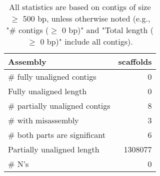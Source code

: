 \documentclass[12pt,a4paper]{article}
\begin{document}
\begin{table}[ht]
\begin{center}
\caption{All statistics are based on contigs of size $\geq$ 500 bp, unless otherwise noted (e.g., "\# contigs ($\geq$ 0 bp)" and "Total length ($\geq$ 0 bp)" include all contigs).}
\begin{tabular}{|l*{1}{|r}|}
\hline
Assembly & scaffolds \\ \hline
\# fully unaligned contigs & 0 \\ \hline
Fully unaligned length & 0 \\ \hline
\# partially unaligned contigs & 8 \\ \hline
\hspace{5mm}\# with misassembly & 3 \\ \hline
\hspace{5mm}\# both parts are significant & 6 \\ \hline
Partially unaligned length & 1308077 \\ \hline
\# N's & 0 \\ \hline
\end{tabular}
\end{center}
\end{table}
\end{document}
